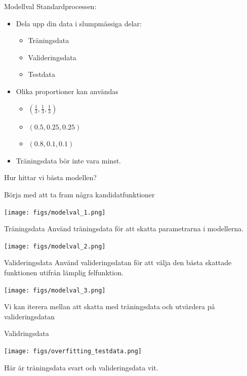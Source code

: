 \documentclass[10pt,english]{beamer}
\begin{document}
\begin{frame}{Modellval}
    Standardprocessen:
    \begin{itemize}
        \item Dela upp din data i slumpmässiga delar:
        \begin{itemize}
            \item Träningsdata
            \item Valideringsdata
            \item Testdata
        \end{itemize}
        \item Olika proportioner kan användas
        \begin{itemize}
            \item $(\tfrac{1}{3}, \tfrac{1}{3}, \tfrac{1}{3})$
            \item $(0.5, 0.25, 0.25)$
            \item $(0.8, 0.1, 0.1)$
        \end{itemize}
        \item Träningsdata bör inte vara minst.
    \end{itemize}
\end{frame}

\begin{frame}{Hur hittar vi bästa modellen?}
    
    Börja med att ta fram några kandidatfunktioner

    \texttt{[image: figs/modelval\_1.png]}

\end{frame}

\begin{frame}{Träningsdata}
    Använd träningsdata för att skatta parametrarna i modellerna.

    \texttt{[image: figs/modelval\_2.png]}
\end{frame}

\begin{frame}{Valideringsdata}
    Använd valideringsdatan för att välja den bästa skattade funktionen utifrån lämplig felfunktion. 

    \texttt{[image: figs/modelval\_3.png]}

    Vi kan iterera mellan att skatta med träningsdata och utvärdera på valideringsdatan

\end{frame}

\begin{frame}{Validringsdata}
    
    \texttt{[image: figs/overfitting\_testdata.png]}

    Här är träningsdata svart och valideringsdata vit.

\end{frame}
\end{document}
